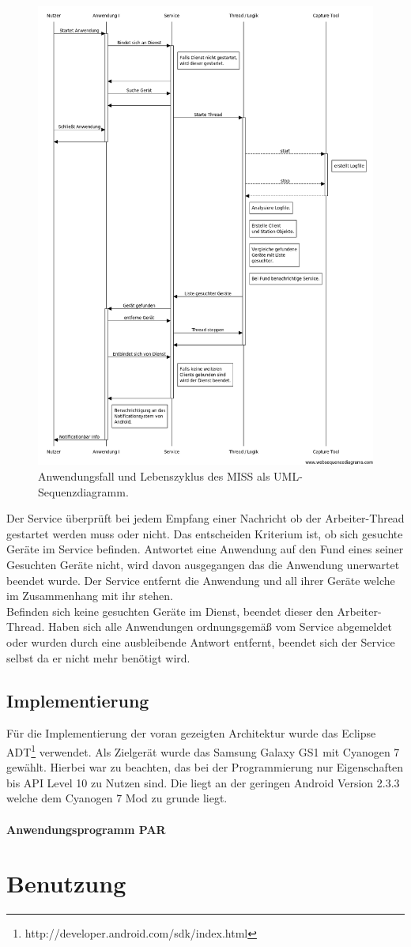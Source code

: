 \documentclass[]{report}
\begin{document}
\begin{figure}
    \centering 
    \includegraphics[width=5.0in]{bilder/uml.png}
    \caption{Anwendungsfall und Lebenszyklus des MISS als UML-Sequenzdiagramm.}
    \label{fig:uml}
\end{figure}
Der Service überprüft bei jedem Empfang einer Nachricht ob der Arbeiter-Thread gestartet werden muss oder nicht. Das entscheiden Kriterium ist, ob sich gesuchte Geräte im Service befinden. Antwortet eine Anwendung auf den Fund eines seiner Gesuchten Geräte nicht, wird davon ausgegangen das die Anwendung unerwartet beendet wurde. Der Service entfernt die Anwendung und all ihrer Geräte welche im Zusammenhang mit ihr stehen.\\
Befinden sich keine gesuchten Geräte im Dienst, beendet dieser den Arbeiter-Thread. Haben sich alle Anwendungen ordnungsgemäß vom Service abgemeldet oder wurden durch eine ausbleibende Antwort entfernt, beendet sich der Service selbst da er nicht mehr benötigt wird.
\section{Implementierung}
Für die Implementierung der voran gezeigten Architektur wurde das Eclipse ADT\footnote{http://developer.android.com/sdk/index.html} verwendet. Als Zielgerät wurde das Samsung Galaxy GS1 mit Cyanogen 7 gewählt. Hierbei war zu beachten, das bei der Programmierung nur Eigenschaften bis API Level 10 zu Nutzen sind. Die liegt an der geringen Android Version 2.3.3 welche dem Cyanogen 7 Mod zu grunde liegt. \\
\subsubsection{Anwendungsprogramm PAR}

\chapter{Benutzung}
\end{document}
